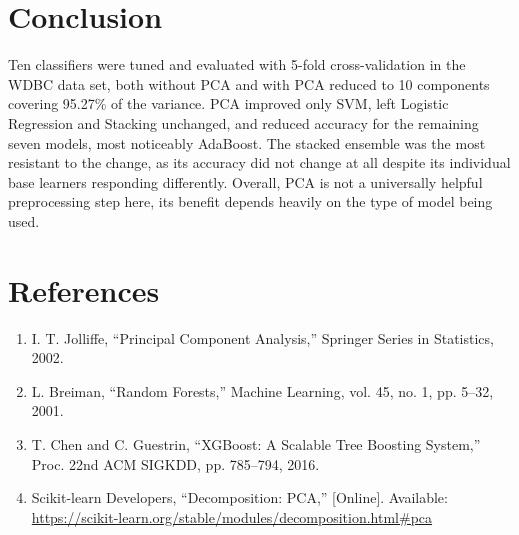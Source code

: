\documentclass[12pt,a4paper]{article}
\begin{document}
\section{Conclusion}
Ten classifiers were tuned and evaluated with 5-fold cross-validation in the WDBC data set, both without PCA and with PCA reduced to 10 components covering 95.27\% of the variance. PCA improved only SVM, left Logistic Regression and Stacking unchanged, and reduced accuracy for the remaining seven models, most noticeably AdaBoost. The stacked ensemble was the most resistant to the change, as its accuracy did not change at all despite its individual base learners responding differently. Overall, PCA is not a universally helpful preprocessing step here, its benefit depends heavily on the type of model being used.

\section{References}
\begin{enumerate}
\item I. T. Jolliffe, ``Principal Component Analysis,'' Springer Series in Statistics, 2002.
\item L. Breiman, ``Random Forests,'' Machine Learning, vol. 45, no. 1, pp. 5--32, 2001.
\item T. Chen and C. Guestrin, ``XGBoost: A Scalable Tree Boosting System,'' Proc. 22nd ACM SIGKDD, pp. 785--794, 2016.
\item Scikit-learn Developers, ``Decomposition: PCA,'' [Online]. Available: \url{https://scikit-learn.org/stable/modules/decomposition.html#pca}
\end{enumerate}
\end{document}
